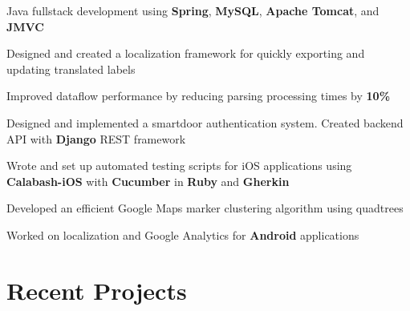\documentclass[]{peter_resume}
\begin{document}
\begin{minipage}{\textwidth}
\begin{tightemize}
\item Java fullstack development using \textbf{Spring}, \textbf{MySQL}, \textbf{Apache Tomcat}, and \textbf{JMVC}
\item Designed and created a localization framework for quickly exporting and updating translated labels
\item Improved dataflow performance by reducing parsing processing times by \textbf{10\%}
\end{tightemize}
\sectionsep

\begin{tightemize}
\item Designed and implemented a smartdoor authentication system. Created backend API with \textbf{Django} REST framework
\item Wrote and set up automated testing scripts for iOS applications using \textbf{Calabash-iOS} with \textbf{Cucumber} in \textbf{Ruby} and \textbf{Gherkin}
\item Developed an efficient Google Maps marker clustering algorithm using quadtrees
\item Worked on localization and Google Analytics for \textbf{Android} applications
\end{tightemize}
\sectionsep


\begin{comment}
\runsubsection{Imagine Communications}
\descript{\hfill Application Developer}
\location{May 2014 – Aug 2014 | Waterloo, ON}
\begin{tightemize}
\item Developed an internal progress dashboard to record and monitor employee efficiency using \textbf{AngularJS} and \textbf{Bootstrap}
\item Worked on a \textbf{C\#} API for the progress dashboard
\item Maintained existing software systems by fixing bugs in the Silverlight frontend and \textbf{C\#} backend
\end{tightemize}
\sectionsep
\end{comment}


\section{Recent Projects}


\end{minipage}
\end{document}

